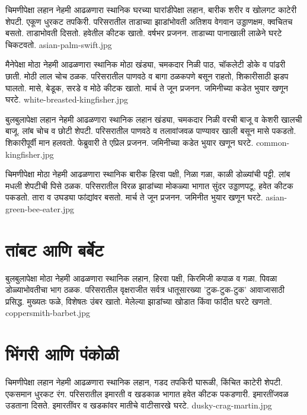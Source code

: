 \documentclass[aspectratio=169]{beamer}
\begin{document}
{चिमणीपेक्षा लहान}
{नेहमी आढळणारा स्थानिक}
{घरच्या घारांडीपेक्षा लहान, बारीक शरीर व खोलगट काटेरी शेपटी. एकूण धुरकट तपकिरी.}
{परिसरातील ताडाच्या झाडांभोवती}
{अतिशय वेगवान उड्डाणक्षम, क्वचितच बसतो. ताडाभोवती दिसतो. हवेतील कीटक खातो.}
{वर्षभर प्रजनन. ताडाच्या पानाखाली लाळेने घरटे चिकटवतो.}
{asian-palm-swift.jpg}

{मैनेपेक्षा मोठा}
{नेहमी आढळणारा स्थानिक}
{मोठा खंड्या, चमकदार निळी पाठ, चॉकलेटी डोके व पांढरी छाती. मोठी लाल चोच ठळक.}
{परिसरातील पाणवठे व बागा}
{ठळकपणे बसून राहतो, शिकारीसाठी झडप घालतो. मासे, बेडूक, सरडे व मोठे कीटक खातो.}
{मार्च ते जून प्रजनन. जमिनीच्या कडेत भुयार खणून घरटे.}
{white-breasted-kingfisher.jpg}

{बुलबुलापेक्षा लहान}
{नेहमी आढळणारा स्थानिक}
{लहान खंड्या, चमकदार निळी वरची बाजू व केशरी खालची बाजू. लांब चोच व छोटी शेपटी.}
{परिसरातील पाणवठे व तलावांजवळ}
{पाण्यावर खाली बसून मासे पकडतो. शिकारीपूर्वी मान हलवतो.}
{फेब्रुवारी ते एप्रिल प्रजनन. जमिनीच्या कडेत भुयार खणून घरटे.}
{common-kingfisher.jpg}

{चिमणीपेक्षा मोठा}
{नेहमी आढळणारा स्थानिक}
{बारीक हिरवा पक्षी, निळा गळा, काळी डोळ्यांची पट्टी. लांब मधली शेपटीची पिसे ठळक.}
{परिसरातील विरळ झाडांच्या मोकळ्या भागात}
{सुंदर उड्डाणपटू, हवेत कीटक पकडतो. तारा व उघड्या फांद्यांवर बसतो.}
{मार्च ते जून प्रजनन. जमिनीत भुयार खणून घरटे.}
{asian-green-bee-eater.jpg}

\section{तांबट आणि बर्बेट}
{बुलबुलापेक्षा मोठा}
{नेहमी आढळणारा स्थानिक}
{लहान, हिरवा पक्षी, किरमिजी कपाळ व गळा. पिवळा डोळ्याभोवतीचा भाग ठळक.}
{परिसरातील वृक्षराजीत सर्वत्र}
{धातूसारख्या 'टुक-टुक-टुक' आवाजासाठी प्रसिद्ध. मुख्यतः फळे, विशेषतः उंबर खातो.}
{मेलेल्या झाडांच्या खोडात किंवा फांदीत घरटे खणतो.}
{coppersmith-barbet.jpg}

\section{भिंगरी आणि पंकोळी}
{चिमणीपेक्षा लहान}
{नेहमी आढळणारा स्थानिक}
{लहान, गडद तपकिरी घारूळी, किंचित काटेरी शेपटी. एकसमान धुरकट रंग.}
{परिसरातील इमारती व खडकाळ भागात}
{हवेत कीटक पकडणारी. इमारतींजवळ उडताना दिसते.}
{इमारतींवर व खडकांवर मातीचे वाटीसारखे घरटे.}
{dusky-crag-martin.jpg}
\end{document}
